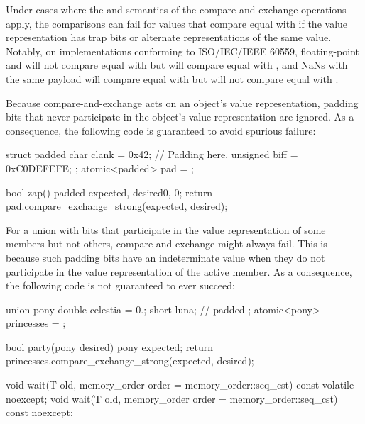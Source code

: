\begin{itemdescr}
\pnum
\begin{note}
Under cases where the  and  semantics of the compare-and-exchange
operations apply, the comparisons can fail for values that compare equal with
 if the value representation has trap bits or alternate
representations of the same value. Notably, on implementations conforming to
ISO/IEC/IEEE 60559, floating-point  and 
will not compare equal with  but will compare equal with ,
and NaNs with the same payload will compare equal with  but will not
compare equal with .
\end{note}
\begin{note}
Because compare-and-exchange acts on an object's value representation,
padding bits that never participate in the object's value representation
are ignored. As a consequence, the following code is guaranteed to avoid
spurious failure:
\begin{codeblock}
struct padded {
  char clank = 0x42;
  // Padding here.
  unsigned biff = 0xC0DEFEFE;
};
atomic<padded> pad = {};

bool zap() {
  padded expected, desired{0, 0};
  return pad.compare_exchange_strong(expected, desired);
}
\end{codeblock}
\end{note}
\begin{note}
For a union with bits that participate in the value representation
of some members but not others, compare-and-exchange might always fail.
This is because such padding bits have an indeterminate value when they
do not participate in the value representation of the active member.
As a consequence, the following code is not guaranteed to ever succeed:
\begin{codeblock}
union pony {
  double celestia = 0.;
  short luna;       // padded
};
atomic<pony> princesses = {};

bool party(pony desired) {
  pony expected;
  return princesses.compare_exchange_strong(expected, desired);
}
\end{codeblock}
\end{note}
\end{itemdescr}

%
%
%
%
\begin{itemdecl}
void wait(T old, memory_order order = memory_order::seq_cst) const volatile noexcept;
void wait(T old, memory_order order = memory_order::seq_cst) const noexcept;
\end{itemdecl}

